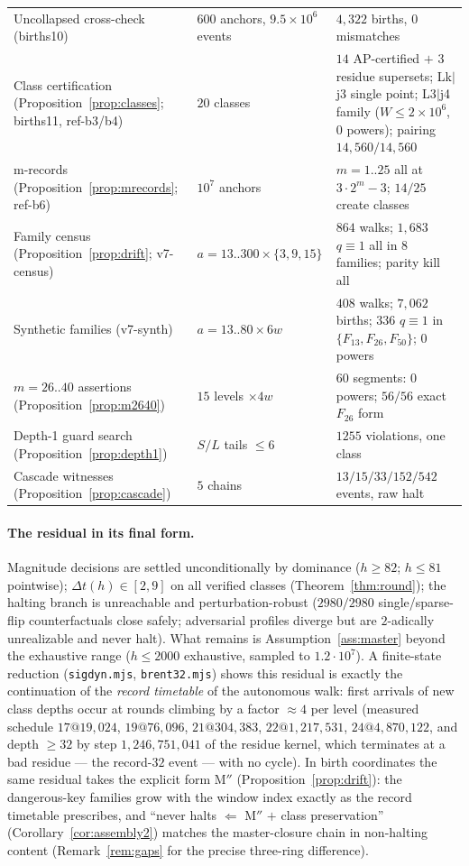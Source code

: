 \documentclass[11pt]{amsart}
\theoremstyle{definition}
\begin{document}
\begin{center}
\begin{tabular}{@{}p{5.0cm}p{3.9cm}p{6.6cm}@{}}
Uncollapsed cross-check (births10) & $600$ anchors, $9.5\times10^{6}$ events & $4{,}322$ births, $0$ mismatches\\
Class certification (Proposition~\ref{prop:classes}; births11, ref-b3/b4) & $20$ classes & $14$ AP-certified $+$ $3$ residue supersets; Lk$|$j3 single point; L3$|$j4 family ($W\le2\times10^{6}$, $0$ powers); pairing $14{,}560/14{,}560$\\
m-records (Proposition~\ref{prop:mrecords}; ref-b6) & $10^{7}$ anchors & $m=1..25$ all at $3\cdot2^{m}-3$; $14/25$ create classes\\
Family census (Proposition~\ref{prop:drift}; v7-census) & $a=13..300\times\{3,9,15\}$ & $864$ walks; $1{,}683$ $q\equiv1$ all in $8$ families; parity kill all\\
Synthetic families (v7-synth) & $a=13..80\times6w$ & $408$ walks; $7{,}062$ births; $336$ $q\equiv1$ in $\{F_{13},F_{26},F_{50}\}$; $0$ powers\\
$m{=}26..40$ assertions (Proposition~\ref{prop:m2640}) & $15$ levels $\times4w$ & $60$ segments: $0$ powers; $56/56$ exact $F_{26}$ form\\
Depth-1 guard search (Proposition~\ref{prop:depth1}) & $S/L$ tails $\le6$ & $1255$ violations, one class\\
Cascade witnesses (Proposition~\ref{prop:cascade}) & $5$ chains & $13/15/33/152/542$ events, raw halt\\
\bottomrule
\end{tabular}
\end{center}

\paragraph{The residual in its final form.}
Magnitude decisions are settled unconditionally by dominance ($h\ge82$;
$h\le81$ pointwise); $\Delta t(h)\in[2,9]$ on all verified classes
(Theorem~\ref{thm:round}); the halting branch is
unreachable and perturbation-robust ($2980/2980$ single/sparse-flip
counterfactuals close safely; adversarial profiles diverge but are
$2$-adically unrealizable and never halt). What remains is
Assumption~\ref{ass:master} beyond the exhaustive range ($h\le2000$
exhaustive, sampled to $1.2\cdot10^{7}$). A finite-state reduction
(\texttt{sigdyn.mjs}, \texttt{brent32.mjs}) shows this residual is exactly
the continuation of the \emph{record timetable} of the autonomous walk:
first arrivals of new class depths occur at rounds climbing by a factor
$\approx4$ per level (measured schedule $17@19{,}024$, $19@76{,}096$,
$21@304{,}383$, $22@1{,}217{,}531$, $24@4{,}870{,}122$, and depth $\ge32$
by step $1{,}246{,}751{,}041$ of the residue kernel, which terminates at a
bad residue --- the record-$32$ event --- with no cycle). In birth
coordinates the same residual takes the explicit form
$\mathrm{M''}$ (Proposition~\ref{prop:drift}): the dangerous-key families
grow with the window index exactly as the record timetable prescribes, and
``never halts $\Leftarrow$ $\mathrm{M''}$ $+$ class preservation''
(Corollary~\ref{cor:assembly2}) matches the master-closure chain in
non-halting content (Remark~\ref{rem:gaps} for the precise three-ring
difference).
\end{document}
